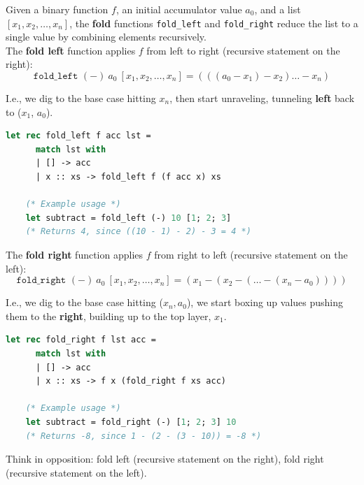 \newpage 

\noindent
\begin{Def}

    Given a binary function \( f \), an initial accumulator value \( a_0 \), and a list \([x_1, x_2, \dots, x_n]\), the \textbf{fold} functions \texttt{fold\_left} and \texttt{fold\_right} reduce the list to a single value by combining elements recursively.\\

    \noindent
    The \textbf{fold left} function applies \( f \) from left to right (recursive statement on the right):
    \[
    \texttt{fold\_left } (-) \ a_0\ [x_1, x_2, \dots, x_n] = (((a_0 - x_1) - x_2) \dots - x_n)
    \]

    \noindent
    I.e., we dig to the base case hitting $x_n$, then start unraveling, tunneling \textbf{left} back to ($x_1$, $a_0$).
    \begin{lstlisting}[language=OCaml, caption={Ocaml Implementation of Fold\_Left}, numbers=none]
    let rec fold_left f acc lst =
      match lst with
      | [] -> acc
      | x :: xs -> fold_left f (f acc x) xs

    (* Example usage *)
    let subtract = fold_left (-) 10 [1; 2; 3]  
    (* Returns 4, since ((10 - 1) - 2) - 3 = 4 *)
    \end{lstlisting}

    \vspace{1em}
    \noindent
    The \textbf{fold right} function applies \( f \) from right to left (recursive statement on the left):
    \[
    \texttt{fold\_right } (-) \ a_0\ [x_1, x_2, \dots, x_n] = (x_1 - (x_2 - (\dots - (x_n - a_0))))
    \]

    \noindent
    I.e., we dig to the base case hitting ($x_n, a_0$), we start boxing up values pushing them to the \textbf{right}, building up to the top layer, $x_1$.
    \begin{lstlisting}[language=OCaml, caption={Ocaml Implementation of Fold\_Right}, numbers=none]
    let rec fold_right f lst acc =
      match lst with
      | [] -> acc
      | x :: xs -> f x (fold_right f xs acc)

    (* Example usage *)
    let subtract = fold_right (-) [1; 2; 3] 10  
    (* Returns -8, since 1 - (2 - (3 - 10)) = -8 *)
    \end{lstlisting}
\end{Def}

\begin{Tip}
    Think in opposition: fold left (recursive statement on the right), fold right (recursive statement on the left).
\end{Tip}


